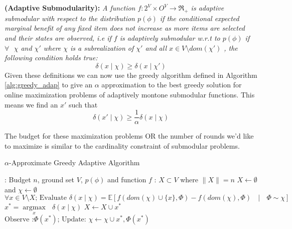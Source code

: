 {\bf {} (Adaptive Submodularity):}
{\it A function $f:2^V \times O^V \rightarrow \Re_+$ is adaptive submodular with respect to the distribution $p(\phi)$ if the conditional expected marginal benefit of any fixed item does not increase as more items are selected and their states are observed, i.e if $f$ is adaptively submodular w.r.t to $p(\phi)$ if $\forall \text{ } \chi$ and $\chi'$ where $\chi$ is a subrealization of $\chi'$ and all $x\in V \setminus dom(\chi')$ , the following condition holds true:}
\[
 \delta(x\mid\chi) \geq \delta(x\mid\chi')
\]
Given these definitions we can now use the greedy algorithm defined in Algorithm \ref{alg:greedy_adap} to give an $\alpha$ approximation to the best greedy solution for online maximization problems of adaptively montone submodular functions. This means we find an $x'$ such that
\[
 \delta(x'\mid\chi) \geq \frac{1}{\alpha}\delta(x\mid\chi)
\]

The budget for these maximization problems OR the number of rounds we'd like to maximize is similar to the cardinality constraint of submodular problems.

\begin{algorithm}[htb]
\caption{$\alpha$-Approximate Greedy Adaptive Algorithm}
\label{alg:greedy_adap}
\begin{algorithmic}[1]
\footnotesize
{}: Budget $n$, ground set $V$, $p(\phi)$ and function $f$ 
: $X \subset V$ where $\|X\| = n$
 $X \leftarrow \emptyset$ and $\chi \leftarrow \emptyset$
  \State $\forall x \in V\setminus X \text{; Evaluate } \delta(x\mid\chi) = \mathbb{E}[f(dom(\chi)\cup\{x\},\Phi) - f(dom(\chi),\Phi) \text{ } \mid \text{ } \Phi \sim \chi]$
  \State $x^* = \underset{x}{\operatorname{argmax }}\text{ } \delta(x\mid\chi)$
  \State $X \leftarrow X \cup {x^*}$
  \State $\text{Observe :} \Phi(x^*) \text{; Update: } \chi \leftarrow \chi \cup {x^*,\Phi(x^*)}$
\EndFor
\end{algorithmic}
\end{algorithm}
